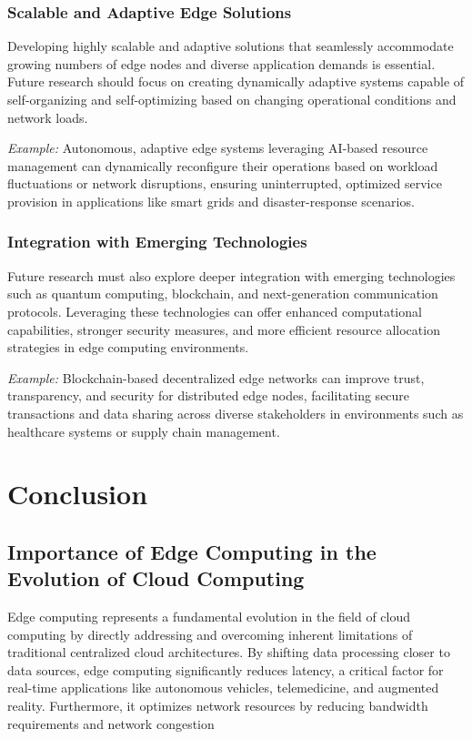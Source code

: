 \documentclass[runningheads]{llncs}
\begin{document}
\subsubsection{Scalable and Adaptive Edge Solutions}
Developing highly scalable and adaptive solutions that seamlessly accommodate growing numbers of edge nodes and diverse application demands is essential. Future research should focus on creating dynamically adaptive systems capable of self-organizing and self-optimizing based on changing operational conditions and network loads.

\textit{Example:} Autonomous, adaptive edge systems leveraging AI-based resource management can dynamically reconfigure their operations based on workload fluctuations or network disruptions, ensuring uninterrupted, optimized service provision in applications like smart grids and disaster-response scenarios.

\subsubsection{Integration with Emerging Technologies}
Future research must also explore deeper integration with emerging technologies such as quantum computing, blockchain, and next-generation communication protocols. Leveraging these technologies can offer enhanced computational capabilities, stronger security measures, and more efficient resource allocation strategies in edge computing environments.

\textit{Example:} Blockchain-based decentralized edge networks can improve trust, transparency, and security for distributed edge nodes, facilitating secure transactions and data sharing across diverse stakeholders in environments such as healthcare systems or supply chain management.

\section{Conclusion}
\subsection{Importance of Edge Computing in the Evolution of Cloud Computing}

Edge computing represents a fundamental evolution in the field of cloud computing by directly addressing and overcoming inherent limitations of traditional centralized cloud architectures. By shifting data processing closer to data sources, edge computing significantly reduces latency, a critical factor for real-time applications like autonomous vehicles, telemedicine, and augmented reality. Furthermore, it optimizes network resources by reducing bandwidth requirements and network congestion
\end{document}

